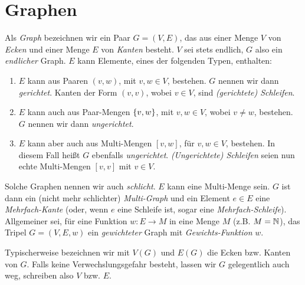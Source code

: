 


    \section{Graphen}

        \begin{definition} \label{def:graph}

            Als \textit{Graph} bezeichnen wir ein Paar $G = (V, E)$, das aus einer Menge $V$ von \textit{Ecken} und einer Menge $E$ von \textit{Kanten} besteht.
            $V$ sei stets endlich, $G$ also ein \textit{endlicher} Graph.
            $E$ kann Elemente, eines der folgenden Typen, enthalten:

            \begin{enumerate}

                \item $E$ kann aus Paaren $(v, w)$, mit $v, w \in V$, bestehen.
                $G$ nennen wir dann \textit{gerichtet}.
                Kanten der Form $(v, v)$, wobei $v \in V$, sind \textit{(gerichtete) Schleifen}.

                \item $E$ kann auch aus Paar-Mengen ${\left \{ v, w \right \}}$, mit $v, w \in V$, wobei $v \neq w$, bestehen.
                $G$ nennen wir dann \textit{ungerichtet}.

                \item $E$ kann aber auch aus Multi-Mengen $[v, w]$, für $v, w \in V$, bestehen.
                In diesem Fall heißt $G$ ebenfalls \textit{ungerichtet}.
                \textit{(Ungerichtete) Schleifen} seien nun echte Multi-Mengen $[v, v]$ mit $v \in V$.

            \end{enumerate}

            Solche Graphen nennen wir auch \textit{schlicht}.
            $E$ kann eine Multi-Menge sein.
            $G$ ist dann ein (nicht mehr schlichter) \textit{Multi-Graph} und ein Element $e \in E$ eine \textit{Mehrfach-Kante} (oder, wenn $e$ eine Schleife ist, sogar eine \textit{Mehrfach-Schleife}).
            Allgemeiner sei, für eine Funktion $w: E \to M$ in eine Menge $M$ (z.B. $M = \mathbb N$), das Tripel $G = (V, E, w)$ ein \textit{gewichteter} Graph mit \textit{Gewichts-Funktion} $w$.

            Typischerweise bezeichnen wir mit $V(G)$ und $E(G)$ die Ecken bzw. Kanten von $G$.
            Falls keine Verwechslungsgefahr besteht, lassen wir $G$ gelegentlich auch weg, schreiben also $V$ bzw. $E$.

        \end{definition}

